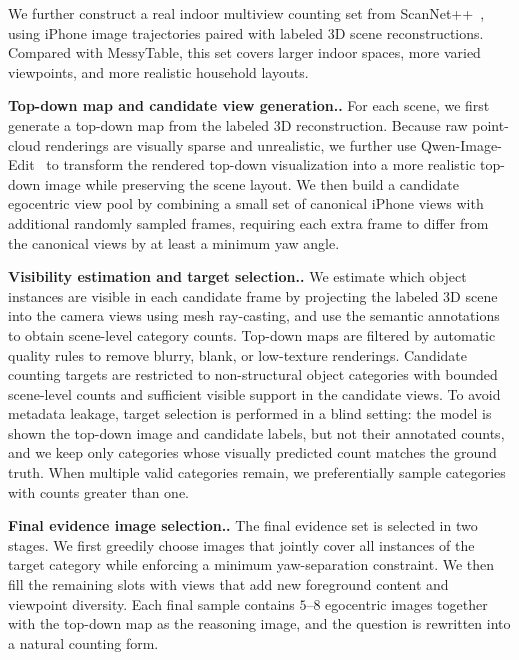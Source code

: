 \documentclass{llmxive}
\providecommand{\paragraph}[1]{\vspace{.5em}\noindent\textbf{#1.}}
\begin{document}
We further construct a real indoor multiview counting set from ScanNet++~\cite{yeshwanth2023scannet++}, using iPhone image trajectories paired with labeled 3D scene reconstructions. Compared with MessyTable, this set covers larger indoor spaces, more varied viewpoints, and more realistic household layouts.

\paragraph{Top-down map and candidate view generation.}
For each scene, we first generate a top-down map from the labeled 3D reconstruction. Because raw point-cloud renderings are visually sparse and unrealistic, we further use Qwen-Image-Edit~\cite{wu2025qwenimagetechnicalreport} to transform the rendered top-down visualization into a more realistic top-down image while preserving the scene layout. We then build a candidate egocentric view pool by combining a small set of canonical iPhone views with additional randomly sampled frames, requiring each extra frame to differ from the canonical views by at least a minimum yaw angle.

\paragraph{Visibility estimation and target selection.}
We estimate which object instances are visible in each candidate frame by projecting the labeled 3D scene into the camera views using mesh ray-casting, and use the semantic annotations to obtain scene-level category counts. Top-down maps are filtered by automatic quality rules to remove blurry,
blank, or low-texture renderings. Candidate counting targets are restricted to non-structural object categories with bounded scene-level counts and sufficient visible support in the candidate views. To avoid metadata leakage, target selection is performed in a blind setting: the model is shown
the top-down image and candidate labels, but not their annotated counts, and we keep only categories whose visually predicted count matches the ground truth. When multiple valid categories remain, we preferentially sample categories with counts greater than one.

\paragraph{Final evidence image selection.}
The final evidence set is selected in two stages. We first greedily choose images that jointly cover all instances of the target category while enforcing a minimum yaw-separation constraint. We then fill the remaining slots with views that add new foreground content and viewpoint diversity.
Each final sample contains $5$--$8$ egocentric images together with the top-down map as the reasoning image, and the question is rewritten into a natural counting form.
\end{document}
